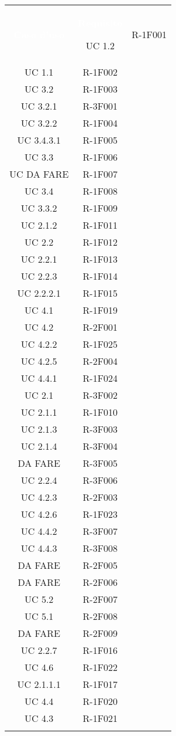 \begin{tabularx}{\textwidth}{c|c}
	
	\rowcolor{greySWEight}
	\textcolor{white}{\textbf{Caso d'uso}} &
	\textcolor{white}{\textbf{Requisito}}\endhead

 	UC 1.2 & R-1F001\\
	UC 1.1 & R-1F002\\
	UC 3.2 & R-1F003\\
	UC 3.2.1 & R-3F001\\
	UC 3.2.2 & R-1F004\\
	UC 3.4.3.1 & R-1F005\\
	UC 3.3 & R-1F006\\
	UC DA FARE & R-1F007\\
	UC 3.4 & R-1F008\\
	UC 3.3.2 & R-1F009\\
	UC 2.1.2 & R-1F011\\
	UC 2.2 & R-1F012\\
	UC 2.2.1 & R-1F013\\
	UC 2.2.3 & R-1F014\\
	UC 2.2.2.1 & R-1F015\\
	UC 4.1 & R-1F019\\
	UC 4.2 & R-2F001\\
	UC 4.2.2 & R-1F025\\
	UC 4.2.5 & R-2F004\\
	UC 4.4.1 & R-1F024\\
	UC 2.1 & R-3F002\\
	UC 2.1.1 & R-1F010\\
	UC 2.1.3 & R-3F003\\
	UC 2.1.4 & R-3F004\\
	DA FARE & R-3F005\\
	UC 2.2.4 & R-3F006\\
	UC 4.2.3 & R-2F003\\
	UC 4.2.6 & R-1F023\\
	UC 4.4.2 & R-3F007\\
	UC 4.4.3 & R-3F008\\
	DA FARE & R-2F005\\
	DA FARE & R-2F006\\
	UC 5.2 & R-2F007\\
	UC 5.1 & R-2F008\\
	DA FARE & R-2F009\\
	UC 2.2.7 & R-1F016\\
	UC 4.6   & R-1F022\\
	UC 2.1.1.1 & R-1F017\\
	UC 4.4   & R-1F020\\
	UC 4.3     & R-1F021\\
	
	\caption{Tabella tracciamento casi d'uso-requisiti} \label{tab:tabellafonterequisiti}
\end{tabularx}